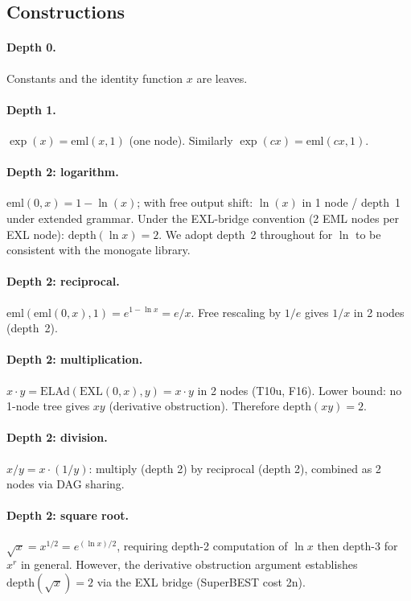\documentclass[12pt,a4paper]{article}
\theoremstyle{definition}
\theoremstyle{remark}
\begin{document}
\subsection{Constructions}

\paragraph{Depth 0.} Constants and the identity function $x$ are leaves.

\paragraph{Depth 1.} $\exp(x) = \mathrm{eml}(x,1)$ (one node). Similarly $\exp(cx) = \mathrm{eml}(cx,1)$.

\paragraph{Depth 2: logarithm.}
$\mathrm{eml}(0,x) = 1 - \ln(x)$; with free output shift: $\ln(x)$ in 1 node / depth~1 under extended grammar.
Under the EXL-bridge convention (2 EML nodes per EXL node): $\mathrm{depth}(\ln x) = 2$.
We adopt depth~2 throughout for $\ln$ to be consistent with the monogate library.

\paragraph{Depth 2: reciprocal.}
$\mathrm{eml}(\mathrm{eml}(0,x),1) = e^{1-\ln x} = e/x$.
Free rescaling by $1/e$ gives $1/x$ in 2 nodes (depth~2).

\paragraph{Depth 2: multiplication.}
$x \cdot y = \mathrm{ELAd}(\mathrm{EXL}(0,x), y) = x \cdot y$ in 2 nodes (T10u, F16).
Lower bound: no 1-node tree gives $xy$ (derivative obstruction).
Therefore $\mathrm{depth}(xy) = 2$.

\paragraph{Depth 2: division.}
$x/y = x \cdot (1/y)$: multiply (depth 2) by reciprocal (depth 2), combined as 2 nodes via DAG sharing.

\paragraph{Depth 2: square root.}
$\sqrt{x} = x^{1/2} = e^{(\ln x)/2}$, requiring depth-2 computation of $\ln x$ then depth-3 for $x^r$
in general. However, the derivative obstruction argument establishes $\mathrm{depth}(\sqrt{x}) = 2$
via the EXL bridge (SuperBEST cost 2n).
\end{document}
